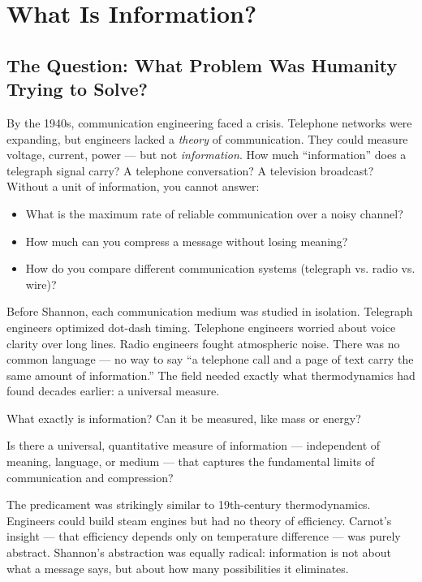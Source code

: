 
\chapter{What Is Information?}
\label{ch:information}

\section{The Question: What Problem Was Humanity Trying to Solve?}
\label{sec:information:question}

By the 1940s, communication engineering faced a crisis. Telephone networks were expanding, but engineers lacked a \emph{theory} of communication. They could measure voltage, current, power — but not \emph{information}. How much ``information'' does a telegraph signal carry? A telephone conversation? A television broadcast? Without a unit of information, you cannot answer:

\begin{itemize}
\item What is the maximum rate of reliable communication over a noisy channel?
\item How much can you compress a message without losing meaning?
\item How do you compare different communication systems (telegraph vs. radio vs. wire)?
\end{itemize}

Before Shannon, each communication medium was studied in isolation. Telegraph engineers optimized dot-dash timing. Telephone engineers worried about voice clarity over long lines. Radio engineers fought atmospheric noise. There was no common language — no way to say ``a telephone call and a page of text carry the same amount of information.'' The field needed exactly what thermodynamics had found decades earlier: a universal measure.

What exactly is information? Can it be measured, like mass or energy?

Is there a universal, quantitative measure of information — independent of meaning, language, or medium — that captures the fundamental limits of communication and compression?

The predicament was strikingly similar to 19th-century thermodynamics. Engineers could build steam engines but had no theory of efficiency. Carnot's insight — that efficiency depends only on temperature difference — was purely abstract. Shannon's abstraction was equally radical: information is not about what a message says, but about how many possibilities it eliminates.

